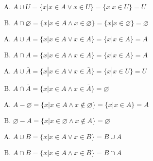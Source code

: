 {{        %
        \begin{practices}
            \begin{enumerate}[A.]
                \item $A \cup U = \{x | x \in A \vee x \in U\} = \{x | x \in U\} = U$
                \item $A \cap \varnothing = \{x | x \in A \wedge x \in \varnothing\} = \{x | x \in \varnothing\} = \varnothing$
            \end{enumerate}
        \end{practices}

        \begin{practices}
            \begin{enumerate}[A.]
                \item $A \cup A = \{x | x \in A \vee x \in A\} = \{x | x \in A\} = A$
                \item $A \cap A = \{x | x \in A \wedge x \in A\} = \{x | x \in A\} = A$
            \end{enumerate}
        \end{practices}

        \begin{practices}
            \begin{enumerate}[A.]
                \item $A \cup \bar{A} = \{x | x \in A \vee x \in \bar{A}\} = \{x | x \in U\} = U$
                \item $A \cap \bar{A} = \{x | x \in A \wedge x \in \bar{A}\} = \varnothing$
            \end{enumerate}
        \end{practices}

        \begin{practices}
            \begin{enumerate}[A.]
                \item $A - \varnothing = \{x | x \in A \wedge x \notin \varnothing\} = \{x | x \in A\} = A$
                \item $\varnothing - A = \{x | x \in \varnothing \wedge x \notin A\} = \varnothing$
            \end{enumerate}
        \end{practices}

        \begin{practices}
            \begin{enumerate}[A.]
                \item $A \cup B = \{x | x \in A \vee x \in B\} = B \cup A$
                \item $A \cap B = \{x | x \in A \wedge x \in B\} = B \cap A$
            \end{enumerate}
        \end{practices}

}}
